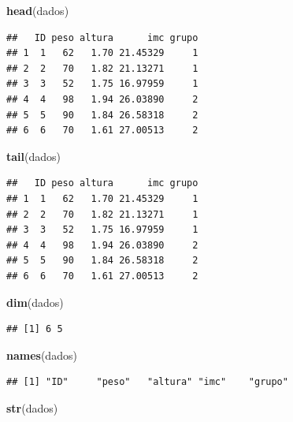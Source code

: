 \documentclass[
]{book}
\newenvironment{Shaded}{\begin{snugshade}}{\end{snugshade}}
\newcommand{\KeywordTok}[1]{\textcolor[rgb]{0.13,0.29,0.53}{\textbf{#1}}}
\newcommand{\NormalTok}[1]{#1}
\begin{document}
\begin{Shaded}
\begin{Highlighting}[]
\KeywordTok{head}\NormalTok{(dados)}
\end{Highlighting}
\end{Shaded}

\begin{verbatim}
##   ID peso altura      imc grupo
## 1  1   62   1.70 21.45329     1
## 2  2   70   1.82 21.13271     1
## 3  3   52   1.75 16.97959     1
## 4  4   98   1.94 26.03890     2
## 5  5   90   1.84 26.58318     2
## 6  6   70   1.61 27.00513     2
\end{verbatim}

\begin{Shaded}
\begin{Highlighting}[]
\KeywordTok{tail}\NormalTok{(dados)}
\end{Highlighting}
\end{Shaded}

\begin{verbatim}
##   ID peso altura      imc grupo
## 1  1   62   1.70 21.45329     1
## 2  2   70   1.82 21.13271     1
## 3  3   52   1.75 16.97959     1
## 4  4   98   1.94 26.03890     2
## 5  5   90   1.84 26.58318     2
## 6  6   70   1.61 27.00513     2
\end{verbatim}

\begin{Shaded}
\begin{Highlighting}[]
\KeywordTok{dim}\NormalTok{(dados)}
\end{Highlighting}
\end{Shaded}

\begin{verbatim}
## [1] 6 5
\end{verbatim}

\begin{Shaded}
\begin{Highlighting}[]
\KeywordTok{names}\NormalTok{(dados)}
\end{Highlighting}
\end{Shaded}

\begin{verbatim}
## [1] "ID"     "peso"   "altura" "imc"    "grupo"
\end{verbatim}

\begin{Shaded}
\begin{Highlighting}[]
\KeywordTok{str}\NormalTok{(dados)}
\end{Highlighting}
\end{Shaded}
\end{document}
